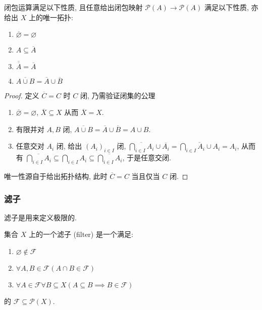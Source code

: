 \begin{axiom}
    \label {axiom:kuratowski closure}
    闭包运算满足以下性质, 且任意给出闭包映射 \(\mathcal{P} (A) \to \mathcal{P} (A)\) 满足以下性质, 亦给出 \(X\) 上的唯一拓扑:

    \begin{enumerate}
        \item \(\overline{\varnothing} = \varnothing\)
        \item \(A \subseteq \overline{A}\)
        \item \(\overline{\overline{A}} = \overline{A}\)
        \item \(\overline{A \cup B} = \overline{A} \cup \overline{B}\)
    \end{enumerate}

    \begin{proof}
        定义 \(\overline{C} = C\) 时 \(C\) 闭, 乃需验证闭集的公理

        \begin{enumerate}
            \item \(\overline{\varnothing} = \varnothing\), \(\overline{X} \subseteq X\) 从而 \(\overline{X} = X\).
            \item 有限并对 \(A,B\) 闭, \(\overline{A \cup B} = \overline{A} \cup \overline{B} = A \cup B\).
            \item 任意交对 \(A_i\) 闭, 给出 \({(A_i)}_{i \in I}\) 闭, \(\overline{\bigcap_{i \in I} A_i} \cup \overline{A_i} = \overline{\bigcap_{i \in I} A_i \cup A_i} = A_i\),
                    从而有 \(\overline{\bigcap_{i \in I} A_i} \subseteq \bigcap_{i \in I} A_i \subseteq \overline{\bigcap_{i \in I} A_i}\), 于是任意交闭.
        \end{enumerate}

        唯一性源自于给出拓扑结构, 此时 \(\overline{C} = C\) 当且仅当 \(C\) 闭.
    \end{proof}
\end{axiom}

\subsubsection{滤子}

滤子是用来定义极限的.

\begin{definition}[滤子]
    集合 \(X\) 上的一个滤子 (filter) 是一个满足:

    \begin{enumerate}
        \item \(\varnothing \notin \mathcal{F}\)
        \item \(\forall A,B \in \mathcal{F} (A \cap B \in \mathcal{F})\)
        \item \(\forall A \in \mathcal{F} \forall B \subseteq X (A \subseteq B \implies B \in \mathcal{F})\)
    \end{enumerate}

    的 \(\mathcal{F} \subseteq \mathcal{P} (X)\).
\end{definition}

